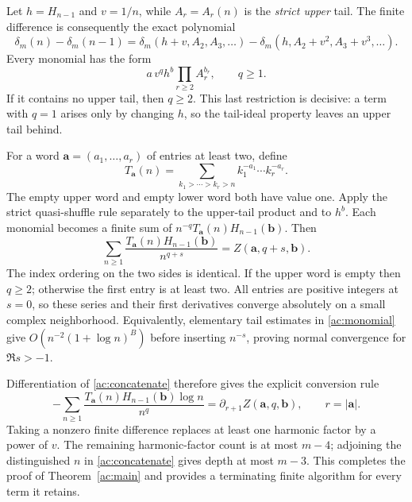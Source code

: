 \documentclass[11pt,a4paper]{article}
\numberwithin{equation}{section}
\theoremstyle{definition}
\theoremstyle{remark}
\begin{document}
Let $h=H_{n-1}$ and $v=1/n$, while $A_r=A_r(n)$ is the
\emph{strict upper} tail. The finite difference is consequently
the exact polynomial
\begin{equation}\label{ac:delta-rule}
 \delta_m(n)-\delta_m(n-1)
 =\delta_m(h+v,A_2,A_3,\ldots)
   -\delta_m(h,A_2+v^2,A_3+v^3,\ldots).
\end{equation}
Every monomial has the form
\begin{equation}\label{ac:monomial}
 a\,v^q h^b\prod_{r\ge2}A_r^{b_r},\qquad q\ge1.
\end{equation}
If it contains no upper tail, then $q\ge2$. This last restriction
is decisive: a term with $q=1$ arises only by changing $h$, so
the tail-ideal property leaves an upper tail behind.

For a word $\mathbf a=(a_1,\ldots,a_r)$ of entries at least two,
define
\[
 T_{\mathbf a}(n)=\sum_{k_1>\cdots>k_r>n}
                        k_1^{-a_1}\cdots k_r^{-a_r}.
\]
The empty upper word and empty lower word both have value one.
Apply the strict quasi-shuffle rule separately to the upper-tail
product and to $h^b$. Each monomial becomes a finite sum of
$n^{-q}T_{\mathbf a}(n)H_{n-1}(\mathbf b)$. Then
\begin{equation}\label{ac:concatenate}
 \sum_{n\ge1}\frac{T_{\mathbf a}(n)H_{n-1}(\mathbf b)}{n^{q+s}}
       =Z(\mathbf a,q+s,\mathbf b).
\end{equation}
The index ordering on the two sides is identical. If the upper word
is empty then $q\ge2$; otherwise the first entry is at least two.
All entries are positive integers at $s=0$, so these series and
their first derivatives converge absolutely on a small complex
neighborhood. Equivalently, elementary tail estimates in
\eqref{ac:monomial} give $O(n^{-2}(1+\log n)^B)$ before
inserting $n^{-s}$, proving normal convergence for $\Re s>-1$.

Differentiation of \eqref{ac:concatenate} therefore gives the
explicit conversion rule
\begin{equation}\label{ac:marked-rule}
 -\sum_{n\ge1}\frac{T_{\mathbf a}(n)H_{n-1}(\mathbf b)\log n}{n^q}
 =\partial_{r+1}Z(\mathbf a,q,\mathbf b),\qquad r=|\mathbf a|.
\end{equation}
Taking a nonzero finite difference replaces at least one harmonic
factor by a power of $v$. The remaining harmonic-factor count is
at most $m-4$; adjoining the distinguished $n$ in
\eqref{ac:concatenate} gives depth at most $m-3$.
This completes the proof of Theorem~\ref{ac:main} and provides a
terminating finite algorithm for every term it retains.
\end{document}
